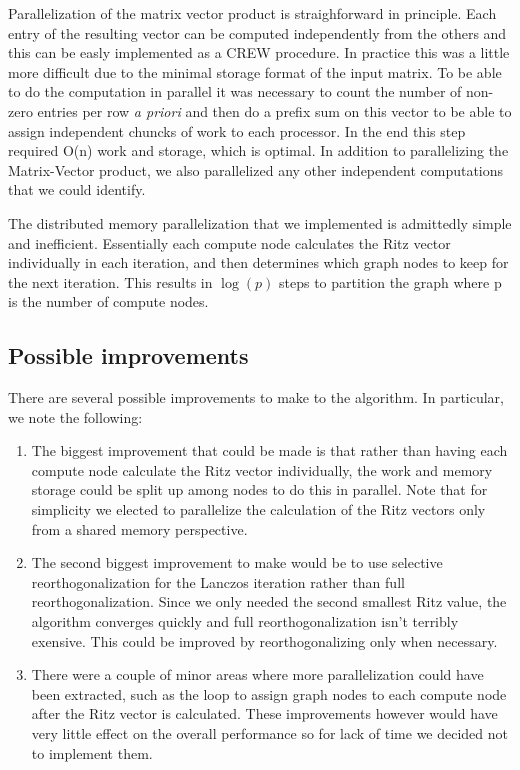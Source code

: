 \documentclass[11pt, oneside]{article}   	%
\begin{document}
Parallelization of the matrix vector product is straighforward in principle. Each entry of the resulting vector can be computed independently from the others and this can be easly implemented as a CREW procedure. In practice this was a little more difficult due to the minimal storage format of the input matrix. To be able to do the computation in parallel it was necessary to count the number of non-zero entries per row \emph{a priori} and then do a prefix sum on this vector to be able to assign independent chuncks of work to each processor. In the end this step required O(n) work and storage, which is optimal. In addition to parallelizing the Matrix-Vector product, we also parallelized any other independent computations that we could identify.

The distributed memory parallelization that we implemented is admittedly simple and inefficient. Essentially each compute node calculates the Ritz vector individually in each iteration, and then determines which graph nodes to keep for the next iteration. This results in $\log(p)$ steps to partition the graph where p is the number of compute nodes.

\subsection{Possible improvements}
There are several possible improvements to make to the algorithm. In particular, we note the following:

\begin{enumerate}
	\item The biggest improvement that could be made is that rather than having each compute node calculate the Ritz vector individually, the work and memory storage could be split up among nodes to do this in parallel.  Note that for simplicity we elected to parallelize the calculation of the Ritz vectors only from a shared memory perspective.

	\item The second biggest improvement to make would be to use selective reorthogonalization for the Lanczos iteration rather than full reorthogonalization. Since we only needed the second smallest Ritz value, the algorithm converges quickly and full reorthogonalization isn't terribly exensive. This could be improved by reorthogonalizing only when necessary.

	\item There were a couple of minor areas where more parallelization could have been extracted, such as the loop to assign graph nodes to each compute node after the Ritz vector is calculated. These improvements however would have very little effect on the overall performance so for lack of time we decided not to implement them.
\end{enumerate}
\end{document}
